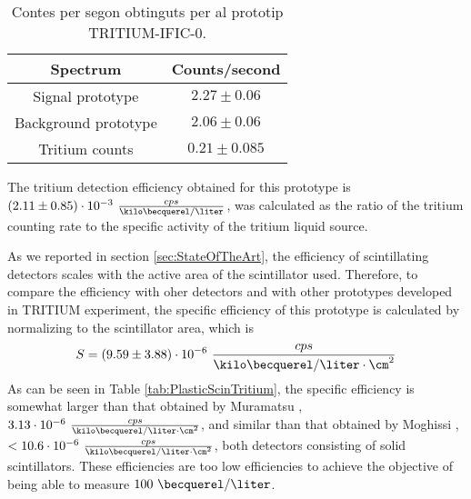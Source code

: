 \begin{table}[htbp]
\centering{}%
\begin{tabular}{cc}
\toprule 
Spectrum & Counts/second \tabularnewline
\midrule
\midrule 
Signal prototype & $2.27 \pm 0.06$ \tabularnewline
Background prototype & $2.06 \pm 0.06$ \tabularnewline  
Tritium counts & $0.21 \pm 0.085$ \tabularnewline
\bottomrule
\end{tabular}
\caption{Contes per segon obtinguts per al prototip TRITIUM-IFIC-0.}
\label{tab:CountsPerSecondTRITIUMIFIC0}
\end{table}

The tritium detection efficiency obtained for this prototype is $(2.11 \pm 0.85)\cdot{} 10^{-3}~\frac{cps}{\kilo\becquerel/\liter}$, was calculated as the ratio of the tritium counting rate to the specific activity of the tritium liquid source. 

As we reported in section \ref{sec:StateOfTheArt}, the efficiency of scintillating detectors scales with the active area of the scintillator used. Therefore, to compare the efficiency with oher detectors and with other prototypes developed in TRITIUM experiment, the specific efficiency of this prototype is calculated by normalizing to the scintillator area, which is 
$$S = (9.59 \pm 3.88)\cdot{} 10^{-6}~\frac{cps}{\kilo\becquerel/\liter \cdot{} \cm^{2}}$$
As can be seen in Table \ref{tab:PlasticScinTritium}, the specific efficiency is somewhat larger than that obtained by Muramatsu \cite{Muramatsu}, $3.13 \cdot{} 10^{-6}~\frac{cps}{\kilo\becquerel/\liter \cdot{} \cm^{2}}$, and similar than that obtained by Moghissi \cite{Moghissi}, $ <10.6 \cdot{} 10^{-6}~\frac{cps}{\kilo\becquerel/\liter \cdot{} \cm^{2}}$, both detectors consisting of solid scintillators. These efficiencies are too low efficiencies to achieve the objective of being able to measure $100~\becquerel/\liter$. 







